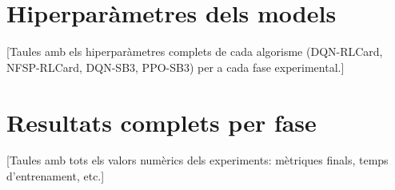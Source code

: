 
\chapter{Hiperparàmetres dels models}
\label{ann:hiperparametres}

[Taules amb els hiperparàmetres complets de cada algorisme (DQN-RLCard, NFSP-RLCard, DQN-SB3, PPO-SB3) per a cada fase experimental.]

\chapter{Resultats complets per fase}
\label{ann:resultats}

[Taules amb tots els valors numèrics dels experiments: mètriques finals, temps d'entrenament, etc.]

